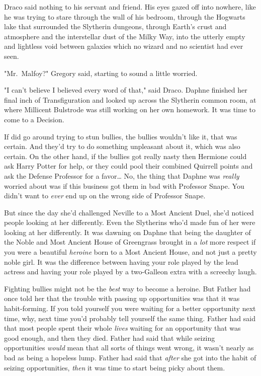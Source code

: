 Draco said nothing to his servant and friend. His eyes gazed off into nowhere, 
like he was trying to stare through the wall of his bedroom, through the 
Hogwarts lake that surrounded the Slytherin dungeons, through Earth's crust and 
atmosphere and the interstellar dust of the Milky Way, into the utterly empty 
and lightless void between galaxies which no wizard and no scientist had ever 
seen.

"Mr.~Malfoy?" Gregory said, starting to sound a little worried.

"I can't believe I believed every word of that," said Draco.
\sbreak
Daphne finished her final inch of Transfiguration and looked up across the 
Slytherin common room, at where Millicent Bulstrode was still working on her 
own homework. It was time to come to a Decision.

If \SPHEW did go around trying to stun bullies, the bullies wouldn't like 
it, that was certain. And they'd try to do something unpleasant about it, which 
was also certain. On the other hand, if the bullies got really nasty then 
Hermione could ask Harry Potter for help, or they could pool their combined 
Quirrell points and ask the Defense Professor for a favor{\ldots} No, the thing 
that Daphne was \emph{really} worried about was if this business got them in 
bad with Professor Snape. You didn't want to \emph{ever} end up on the wrong 
side of Professor Snape.

But since the day she'd challenged Neville to a Most Ancient Duel, she'd 
noticed people looking at her differently. Even the Slytherins who'd made fun 
of her were looking at her differently. It was dawning on Daphne that being the 
daughter of the Noble and Most Ancient House of Greengrass brought in a 
\emph{lot} more respect if you were a beautiful \emph{heroine} born to a Most 
Ancient House, and not just a pretty noble girl. It was the difference between 
having your role played by the lead actress and having your role played by a 
two-Galleon extra with a screechy laugh.

Fighting bullies might not be the \emph{best} way to become a heroine. But 
Father had once told her that the trouble with passing up opportunities was 
that it was habit-forming. If you told yourself you were waiting for a better 
opportunity next time, why, next time you'd probably tell yourself the same 
thing. Father had said that most people spent their whole \emph{lives} waiting 
for an opportunity that was good enough, and then they died. Father had said 
that while seizing opportunities \emph{would} mean that all sorts of things 
went wrong, it wasn't nearly as bad as being a hopeless lump. Father had said 
that \emph{after} she got into the habit of seizing opportunities, \emph{then} 
it was time to start being picky about them.


